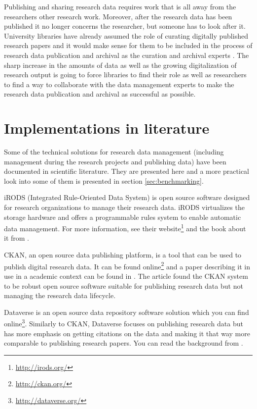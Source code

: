 Publishing and sharing research data requires work that is all away from the
researchers other research work. Moreover, after the research data has been published
it no longer concerns the researcher, but someone has to look after it.
University libraries have already assumed the role of curating digitally
published research papers and it would make sense for them to be included in
the process of research data publication and archival as the curation and
archival experts  \cite{hjorland2014curating, heidorn2011emerging}. The
sharp increase in the amounts of data as well as the growing digitalization of
research output is going to force libraries to find their role as well as
researchers to find a way to collaborate with the data management experts to
make the research data publication and archival as successful as possible.

\section{Implementations in literature}
\label{sec:implementations_literature}

Some of the technical solutions for research data management (including
management during the research projects and publishing data) have been
documented in scientific literature. They are presented here and a more
practical look into some of them is presented in section
\ref{sec:benchmarking}.

iRODS (Integrated Rule-Oriented Data System) is open source software designed
for research organizations to manage their research data. iRODS virtualizes the
storage hardware and offers a programmable rules system to enable automatic
data management. For more information, see their website\footnote{\url{http://irods.org/}} and
the book about it from \cite{DBLP:series/synthesis/2010Rajasekar}.

CKAN, an open source data publishing platform, is a tool that can be used to
publish digital research data. It can be found online\footnote{\url{http://ckan.org/}} and
a paper describing it in use in a academic context can be found in
\cite{winn2013open}. The article found the CKAN system to be robust open source
software suitable for publishing research data but not managing the research
data lifecycle.

Dataverse is an open source data repository software solution which you can
find online\footnote{\url{http://dataverse.org/}}. Similarly to CKAN, Dataverse
focuses on publishing research data but has more emphasis on getting
citations on the data and making it that way more comparable to publishing
research papers. You can read the background from \cite{king2007introduction}.

